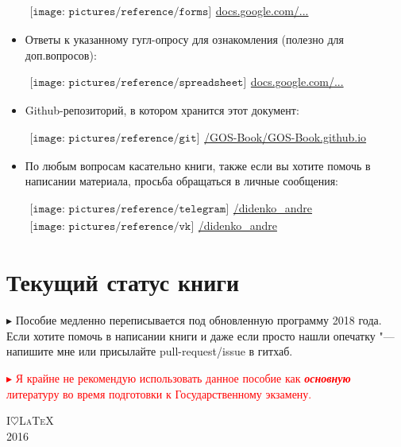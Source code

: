 \begin{flushleft}
\begin{itemize}[wide, labelwidth=!, labelindent=0pt, label=$\blacktriangleright$, noitemsep]
\qquad\href{https://docs.google.com/forms/d/1HCwq1n8G-TNYAN7l5OXy-MO6s5tg1FnEQHVCZxYBVDk/edit?usp=sharing}{$
\begin{array}{l}
\texttt{[image: pictures/reference/forms]}
\end{array}
$\large docs.google.com/...}

\item Ответы к указанному гугл-опросу для ознакомления (полезно для доп.вопросов):

\qquad\href{https://docs.google.com/spreadsheets/d/1ctiu67rO5_bcNxpGqmVNJdiAsFCzZNMT9Og8W7AX6m0/edit?usp=sharing}{$
	\begin{array}{l}
		\texttt{[image: pictures/reference/spreadsheet]}
	\end{array}
	$\large docs.google.com/...}

\item Github-репозиторий, в котором хранится этот документ:

\qquad\href{https://github.com/GOS-Book/GOS-Book.github.io}{$
\begin{array}{l}
\texttt{[image: pictures/reference/git]}
\end{array}
$\large /GOS-Book/GOS-Book.github.io}

\item По любым вопросам касательно книги, также если вы хотите помочь в написании материала, просьба обращаться в личные сообщения: 

\qquad\href{https://t.me/didenko_andre}{$
	\begin{array}{l}
	\texttt{[image: pictures/reference/telegram]}
	\end{array}
	$\large /didenko\_\!andre}
\qquad\href{https://vk.com/didenko_andre}{$
\begin{array}{l}
\texttt{[image: pictures/reference/vk]}
\end{array}
$\large /didenko\_\!andre}
\vspace*{-1\baselineskip}  
\end{itemize}

\section*{\Large Текущий статус книги}

$\blacktriangleright$ Пособие медленно переписывается под обновленную программу 2018 года. Если хотите помочь в написании книги и даже если просто нашли опечатку "--- напишите мне или присылайте pull-request/issue в гитхаб.

\smallskip

\vfill

\textcolor{red}{
$\blacktriangleright$ Я крайне не рекомендую использовать данное пособие как \textit{\textbf{основную}} литературу во время подготовки к Государственному экзамену.
}

\end{flushleft}

\medskip
\vfill
{\huge\scshape I\;$\heartsuit$\;\LaTeX}\\[0.5\baselineskip]
{\LARGE\scshape 2016}\par
\restoregeometry
\endgroup
\newpage
\pagestyle{fancy}